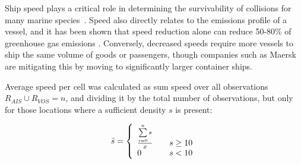 Ship speed plays a critical role in determining the survivability of collisions for many marine species~\citep{Vanderlaan2009}. Speed also directly relates to the emissions profile of a vessel, and it has been shown that speed reduction alone can reduce 50-80\% of greenhouse gas emissions \cite{lack2011impact}. Conversely, decreased speeds require more vessels to ship the same volume of goods or passengers, though companies such as Maersk are mitigating this by moving to significantly larger container ships.

Average speed per cell was calculated as sum speed over all observations $R_{AIS} \cup R_{VOS} = n$, and dividing it by the total number of observations, but only for those locations where a sufficient density $s$ is present: 

\begin{equation}
 \bar{s} = \left\{
   \begin{array}{l l}
    \frac{\sum\limits_{i=0}^n s}{x} & \quad \text{$s \ge 10$}\\
    0 & \quad \text {$s < 10$}
   \end{array}\right.
\end{equation}







